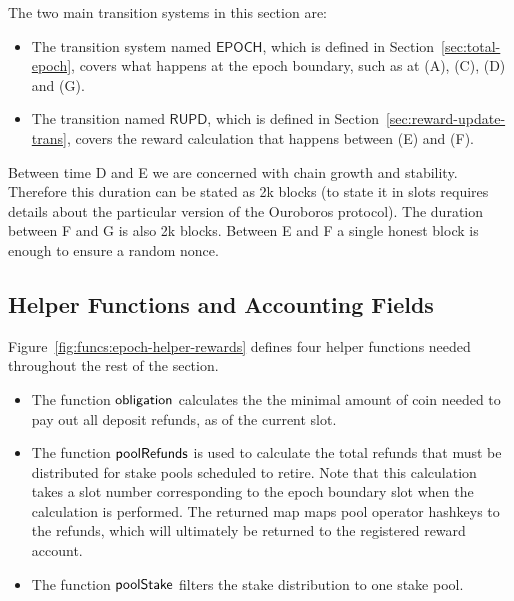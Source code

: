 The two main transition systems in this section are:
\begin{itemize}
  \item The transition system named $\mathsf{EPOCH}$, which is defined in
    Section~\ref{sec:total-epoch}, covers what happens at the epoch boundary,
    such as at (A), (C), (D) and (G).
  \item The transition named $\mathsf{RUPD}$, which is defined in
    Section~\ref{sec:reward-update-trans}, covers the reward calculation that
    happens between (E) and (F).
\end{itemize}


\begin{note}
  Between time D and E we are concerned with chain growth and stability.
  Therefore this duration can be stated as 2k blocks (to state it in slots requires details about
  the particular version of the Ouroboros protocol). The duration between F and G is also 2k blocks.
  Between E and F a single honest block is enough to ensure a random nonce.
\end{note}

\subsection{Helper Functions and Accounting Fields}
\label{sec:stake-dist-helpers}

Figure~\ref{fig:funcs:epoch-helper-rewards} defines four helper functions needed
throughout the rest of the section.

\begin{itemize}
  \item The function $\mathsf{obligation}$ calculates the the minimal amount of coin needed to
    pay out all deposit refunds, as of the current slot.
  \item The function $\mathsf{poolRefunds}$ is used to calculate the total refunds
    that must be distributed for stake pools scheduled to retire.
    Note that this calculation takes a slot number corresponding to the epoch boundary slot
    when the calculation is performed.  The returned map maps pool operator hashkeys to the
    refunds, which will ultimately be returned to the registered reward account.
  \item The function $\mathsf{poolStake}$ filters the stake distribution to one stake pool.
\end{itemize}



